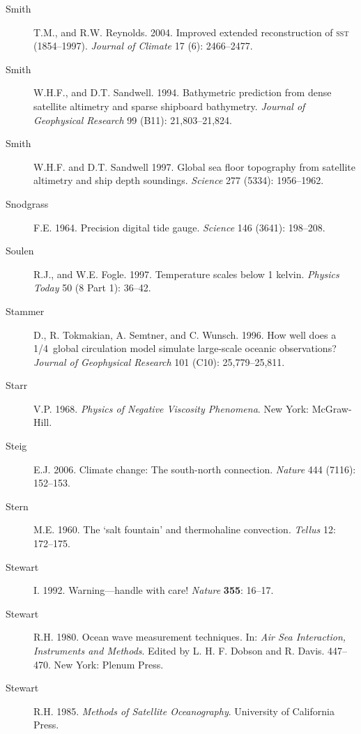 \begin{description}
\item [Smith]T.M., and R.W. Reynolds. 2004. Improved extended reconstruction of \textsc{sst} (1854--1997). \textit{Journal of Climate} 17 (6): 2466--2477.
	
\item [Smith]W.H.F., and D.T. Sandwell. 1994. Bathymetric prediction from dense satellite altimetry and sparse shipboard bathymetry. \textit{Journal of Geophysical Research} 99 (B11): 21,803--21,824.

\item [Smith]W.H.F. and D.T. Sandwell 1997. Global sea floor topography from satellite altimetry and ship depth soundings. \textit{Science} 277 (5334): 1956--1962.

\item[Snodgrass]F.E. 1964. Precision digital tide gauge. \textit{Science} 146 (3641): 198--208.

\item [Soulen]R.J., and W.E. Fogle. 1997. Temperature scales below 1 kelvin. \textit{Physics Today} 50 (8 Part 1): 36--42.

\item [Stammer]D., R. Tokmakian, A. Semtner, and C. Wunsch. 1996. How well does a 1/4\degrees\ global circulation model simulate large-scale oceanic observations? \textit{Journal of Geophysical Research} 101 (C10): 25,779--25,811.

\item [Starr]V.P. 1968. \textit{Physics of Negative Viscosity Phenomena}.  New York: McGraw-Hill.

\item [Steig]E.J. 2006. Climate change: The south-north connection. \textit{Nature} 444 (7116): 152--153.

\item [Stern]M.E. 1960. The `salt fountain' and thermohaline convection. \textit{Tellus} 12: 172--175.

\item [Stewart]I. 1992. Warning---handle with care! \textit{Nature} \textbf{355}:
16--17.

\item [Stewart]R.H. 1980. Ocean wave measurement techniques. In: \textit{Air Sea
Interaction, Instruments and Methods}. Edited by L. H. F. Dobson and R. Davis.
447--470. New York: Plenum Press.

\item [Stewart]R.H. 1985. \textit{Methods of Satellite Oceanography}. University
of California Press.


\end{description}
